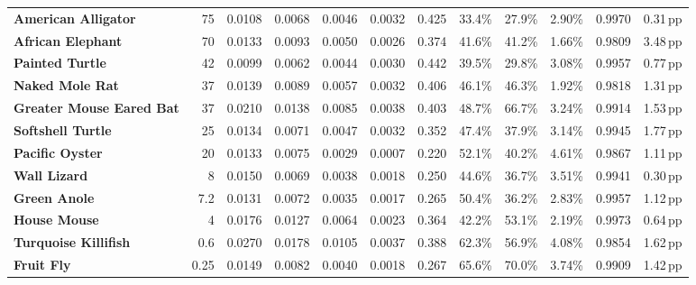 \documentclass[11pt,a4paper]{article}
\renewcommand{\_}{\origunderscore\penalty200\relax}
\theoremstyle{remark}
\begin{document}
\begin{table}[H]
{\begin{tabular}{lrrrrrrrrrrr}
\textbf{American Alligator} & 75 & 0.0108 & 0.0068 & 0.0046 & 0.0032 & 0.425 & 33.4\% & 27.9\% & 2.90\% & 0.9970 & 0.31\,pp \\
\textbf{African Elephant} & 70 & 0.0133 & 0.0093 & 0.0050 & 0.0026 & 0.374 & 41.6\% & 41.2\% & 1.66\% & 0.9809 & 3.48\,pp \\
\textbf{Painted Turtle} & 42 & 0.0099 & 0.0062 & 0.0044 & 0.0030 & 0.442 & 39.5\% & 29.8\% & 3.08\% & 0.9957 & 0.77\,pp \\
\textbf{Naked Mole Rat} & 37 & 0.0139 & 0.0089 & 0.0057 & 0.0032 & 0.406 & 46.1\% & 46.3\% & 1.92\% & 0.9818 & 1.31\,pp \\
\textbf{Greater Mouse Eared Bat} & 37 & 0.0210 & 0.0138 & 0.0085 & 0.0038 & 0.403 & 48.7\% & 66.7\% & 3.24\% & 0.9914 & 1.53\,pp \\
\textbf{Softshell Turtle} & 25 & 0.0134 & 0.0071 & 0.0047 & 0.0032 & 0.352 & 47.4\% & 37.9\% & 3.14\% & 0.9945 & 1.77\,pp \\
\textbf{Pacific Oyster} & 20 & 0.0133 & 0.0075 & 0.0029 & 0.0007 & 0.220 & 52.1\% & 40.2\% & 4.61\% & 0.9867 & 1.11\,pp \\
\textbf{Wall Lizard} & 8 & 0.0150 & 0.0069 & 0.0038 & 0.0018 & 0.250 & 44.6\% & 36.7\% & 3.51\% & 0.9941 & 0.30\,pp \\
\textbf{Green Anole} & 7.2 & 0.0131 & 0.0072 & 0.0035 & 0.0017 & 0.265 & 50.4\% & 36.2\% & 2.83\% & 0.9957 & 1.12\,pp \\
\textbf{House Mouse} & 4 & 0.0176 & 0.0127 & 0.0064 & 0.0023 & 0.364 & 42.2\% & 53.1\% & 2.19\% & 0.9973 & 0.64\,pp \\
\textbf{Turquoise Killifish} & 0.6 & 0.0270 & 0.0178 & 0.0105 & 0.0037 & 0.388 & 62.3\% & 56.9\% & 4.08\% & 0.9854 & 1.62\,pp \\
\textbf{Fruit Fly} & 0.25 & 0.0149 & 0.0082 & 0.0040 & 0.0018 & 0.267 & 65.6\% & 70.0\% & 3.74\% & 0.9909 & 1.42\,pp \\
\bottomrule
\end{tabular}}
\end{table}
\end{document}
